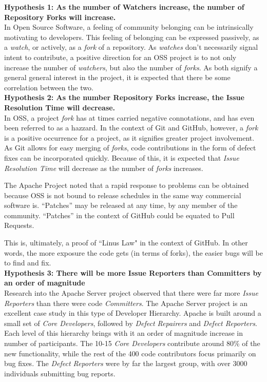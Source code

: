 \documentclass{proc}
\begin{document}
\noindent \textbf{Hypothesis 1: As the number of Watchers increase, the number of Repository Forks will increase.}\\
In Open Source Software, a feeling of community belonging can be intrinsically motivating to developers\cite{lakhani2003hackers}. This feeling of belonging can be expressed passively, as a \emph{watch}, or actively, as a \emph{fork} of a repository. As \emph{watches} don't necessarily signal intent to contribute, a positive direction for an OSS project is to not only increase the number of \emph{watchers}, but also the number of \emph{forks}. As both signify a general general interest in the project, it is expected that there be some correlation between the two.\\

\noindent \textbf{Hypothesis 2: As the number Repository Forks increase, the Issue Resolution Time will decrease.}\\
In OSS, a project \emph{fork} has at times carried negative connotations, and has even been referred to as a hazzard\cite{kogut2001open}. In the context of Git and GitHub, however, a \emph{fork} is a positive occurrence for a project, as it signifies greater project involvement. As Git allows for easy merging of \emph{forks}, code contributions in the form of defect fixes can be incorporated quickly. Because of this, it is expected that \emph{Issue Resolution Time} will decrease as the number of \emph{forks} increases.

The Apache Project noted that a rapid response to problems can be obtained because OSS is not bound to release schedules in the same way commercial software is. ``Patches'' may be released at any time, by any member of the community\cite{mockus2000case}. ``Patches'' in the context of GitHub could be equated to Pull Requests.

This is, ultimately, a proof of ``Linus Law"\cite{raymond1999cathedral} in the context of GitHub. In other words, the more exposure the code gets (in terms of forks), the easier bugs will be to find and fix.\\

\noindent \textbf{Hypothesis 3: There will be more Issue Reporters than Committers by an order of magnitude}\\
Research into the Apache Server project observed that there were far more \emph{Issue Reporters} than there were code \emph{Committers}\cite{mockus2000case}. The Apache Server project is an excellent case study in this type of Developer Hierarchy. Apache is built around a small set of {\it Core Developers}, followed by {\it Defect Repairers} and {\it Defect Reporters}. Each level of this hierarchy brings with it an order of magnitude increase in number of participants. The 10-15 {\it Core Developers} contribute around 80\% of the new functionality, while the rest of the 400 code contributors focus primarily on bug fixes. The {\it Defect Reporters} were by far the largest group, with over 3000 individuals submitting bug reports.
\end{document}
